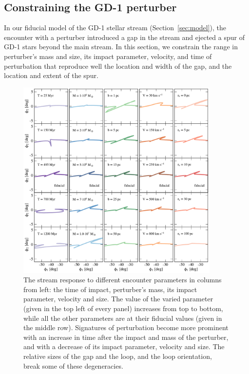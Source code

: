 \documentclass[twocolumn]{aastex62}
\begin{document}
\subsection{Constraining the GD-1 perturber}
\label{sec:perturber_properties}
In our fiducial model of the GD-1 stellar stream (Section~\ref{sec:model}), the encounter with a perturber introduced a gap in the stream and ejected a spur of GD-1 stars beyond the main stream.
In this section, we constrain the range in perturber's mass and size, its impact parameter, velocity, and time of perturbation that reproduce well the location and width of the gap, and the location and extent of the spur.

\begin{figure}
\begin{center}
\includegraphics[width=0.9\textwidth]{excursions.pdf}
\end{center}
\caption{The stream response to different encounter parameters in columns from left: the time of impact, perturber's mass, its impact parameter, velocity and size.
The value of the varied parameter (given in the top left of every panel) increases from top to bottom, while all the other parameters are at their fiducial values (given in the middle row).
Signatures of perturbation become more prominent with an increase in time after the impact and mass of the perturber, and with a decrease of its impact parameter, velocity and size.
The relative sizes of the gap and the loop, and the loop orientation, break some of these degeneracies.
}
\label{fig:scalings}
\end{figure}
\end{document}
